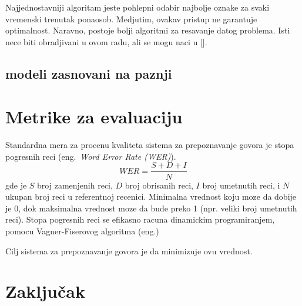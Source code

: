 \documentclass[a4paper]{article}
\begin{document}
Najjednostavniji algoritam jeste pohlepni odabir najbolje oznake za svaki vremenski trenutak ponaosob.  Medjutim, ovakav pristup ne garantuje optimalnost.  Naravno,  postoje bolji algoritmi za resavanje datog problema. Isti nece biti obradjivani u ovom radu, ali se mogu naci u [].

\subsection{modeli zasnovani na paznji}

\section{Metrike za evaluaciju}
Standardna mera za procenu kvaliteta sistema za prepoznavanje govora je stopa pogresnih reci (eng.~{\em Word Error Rate (WER)}).
\begin{equation*}
  WER = \frac{S + D + I}{N}
\end{equation*}
gde je $S$ broj zamenjenih reci, $D$ broj obrisanih reci, $I$ broj umetnutih reci, i $N$ ukupan broj reci u referentnoj recenici.
Minimalna vrednost koju moze da dobije je 0, dok maksimalna vrednost moze da bude preko 1 (npr. veliki broj umetnutih reci).
Stopa pogresnih reci se efikasno racuna dinamickim programiranjem, pomocu Vagner-Fiserovog algoritma (eng.)

Cilj sistema za prepoznavanje govora je da minimizuje ovu vrednost.

\section{Zaključak}
\label{sec:zakljucak}

\end{document}
